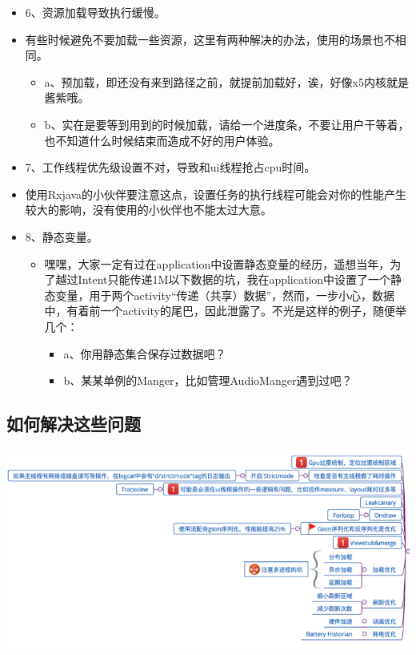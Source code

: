 \documentclass[9pt, b5paper]{article}
\begin{document}
\begin{itemize}
\item 6、资源加载导致执行缓慢。
\item 有些时候避免不要加载一些资源，这里有两种解决的办法，使用的场景也不相同。
\begin{itemize}
\item a、预加载，即还没有来到路径之前，就提前加载好，诶，好像x5内核就是酱紫哦。
\item b、实在是要等到用到的时候加载，请给一个进度条，不要让用户干等着，也不知道什么时候结束而造成不好的用户体验。
\end{itemize}
\item 7、工作线程优先级设置不对，导致和ui线程抢占cpu时间。
\item 使用Rxjava的小伙伴要注意这点，设置任务的执行线程可能会对你的性能产生较大的影响，没有使用的小伙伴也不能太过大意。
\item 8、静态变量。
\begin{itemize}
\item 嘿嘿，大家一定有过在application中设置静态变量的经历，遥想当年，为了越过Intent只能传递1M以下数据的坑，我在application中设置了一个静态变量，用于两个activity“传递（共享）数据”，然而，一步小心，数据中，有着前一个activity的尾巴，因此泄露了。不光是这样的例子，随便举几个：
\begin{itemize}
\item a、你用静态集合保存过数据吧？
\item b、某某单例的Manger，比如管理AudioManger遇到过吧？
\end{itemize}
\end{itemize}
\end{itemize}
\subsection{如何解决这些问题}
\label{sec-1-8}

\includegraphics[width=.9\linewidth]{./pic/solve.png}
\end{document}
